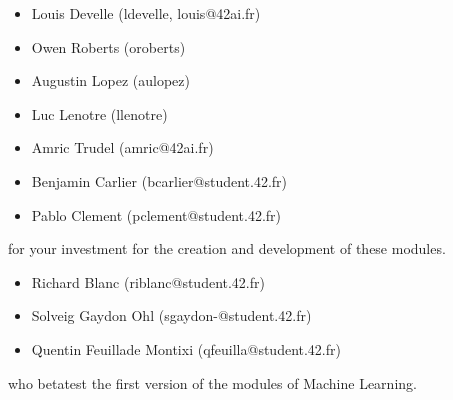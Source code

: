 \documentclass{42-en}
\begin{document}
\begin{itemize}
  \item Louis Develle (ldevelle, louis@42ai.fr)
  \item Owen Roberts (oroberts)
  \item Augustin Lopez (aulopez)
  \item Luc Lenotre (llenotre)
  \item Amric Trudel (amric@42ai.fr)
  \item Benjamin Carlier (bcarlier@student.42.fr)
  \item Pablo Clement (pclement@student.42.fr)
\end{itemize}
for your investment for the creation and development of these modules.

\begin{itemize}
  \item Richard Blanc (riblanc@student.42.fr)
  \item Solveig Gaydon Ohl (sgaydon-@student.42.fr)
  \item Quentin Feuillade Montixi (qfeuilla@student.42.fr)
\end{itemize}
who betatest the first version of the modules of Machine Learning.
\vfill
\doclicenseThis
\end{document}
